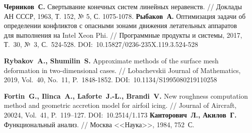 \newpage

\renewcommand{\baselinestretch}{1.0}
\begin{thebibliography}{99}








% 
\textbf{Черников~С.} Свертывание конечных систем линейных неравенств. // Доклады АН СССР, 1963, Т. 152, № 5, С. 1075-1078.
%
\textbf{Рыбаков~А.} Оптимизация задачи об определении конфликтов с опасными зонами движения летательных аппаратов для выполнения на Intel Xeon Phi. // Программные продукты и системы, 2017, Т.~30, №~3, С.~524-528.
DOI:~10.15827/0236-235X.119.3.524-528
%



%
\textbf{Rybakov~A., Shumilin~S.} Approximate methods of the surface mesh deformation in two-dimensional cases. // Lobachevskii Journal of Mathematics, 2019, Vol.~40, No.~11, P.~1848-1852. DOI:~10.1134/S1995080219110258

\textbf{Fortin~G., Ilinca~A., Laforte~J.-L., Brandi~V.} New roughness computation method and geometric accretion model for airfoil icing. // Journal of Aircraft, 20024, Vol.~41, P.~119–127. DOI:~10.2514/1.173
%
\textbf{Канторович~Л., Акилов~Г.} Функциональный анализ. // Москва <<Наука>>, 1984, 752~С.
%




\end{thebibliography}
